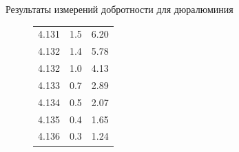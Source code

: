 \documentclass[xcolor=table]{beamer}
\begin{document}
\begin{frame}{Результаты измерений добротности для дюралюминия}
\begin{figure}[ht]
\begin{minipage}{.5\textwidth}
\begin{table}
\begin{tabular}{|c|c|c|}
                    4.131 &	1.5	& 6.20 \\ 
                    4.132 &	1.4	& 5.78 \\
                    4.132 &	1.0	& 4.13 \\
                    4.133 &	0.7	& 2.89 \\
                    4.134 &	0.5	& 2.07 \\
                    4.135 &	0.4 & 1.65 \\
                    4.136 & 0.3	& 1.24 \\
                    \hline
                \end{tabular}
            \end{table}
        \end{minipage}
    \end{figure}
\end{frame}
\end{document}
